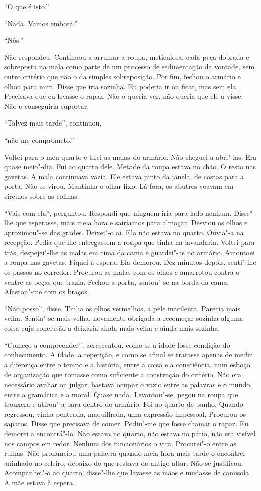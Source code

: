 ``O que é isto.''

``Nada. Vamos embora.''

``Nós.''

Não respondeu. Continuou a arrumar a roupa, meticulosa, cada peça
dobrada e sobreposta na mala como parte de um processo de sedimentação
da vontade, sem outro critério que não o da simples sobreposição. Por
fim, fechou o armário e olhou para mim. Disse que iria sozinha. Eu
poderia ir ou ficar, mas sem ela. Precisava que eu levasse o rapaz. Não
o queria ver, não queria que ele a visse. Não o conseguiria suportar.

``Talvez mais tarde'',
continuou,

``não me comprometo.''

Voltei para o meu quarto e tirei as malas do armário. Não cheguei a
abri"-las. Era quase meio"-dia. Fui ao quarto dele. Metade da roupa
estava no chão. O resto nas gavetas. A mala continuava vazia. Ele estava
junto da janela, de costas para a porta. Não se virou. Mantinha o olhar
fixo. Lá fora, os abutres voavam em círculos sobre as colinas.

``Vais com ela'',
perguntou. Respondi que ninguém iria para lado nenhum. Disse"-lhe que
esperasse, mais meia hora e sairíamos para almoçar. Desviou os olhos e
aproximou"-se das grades. Deixei"-o aí. Ela não estava no quarto.
Ouvia"-a na recepção. Pedia que lhe entregassem a roupa que tinha na
lavandaria. Voltei para trás, despejei"-lhe as malas em cima da cama e
guardei"-as no armário. Amontoei a roupa nas gavetas. Fiquei à espera.
Ela demorou. Dez minutos depois, senti"-lhe os passos no corredor.
Procurou as malas com os olhos e amarrotou contra o ventre as peças que
trazia. Fechou a porta, sentou"-se na borda da cama. Afastou"-me com os
braços.

``Não posso'',
disse. Tinha os olhos vermelhos, a pele macilenta. Parecia mais velha.
Sentia"-se mais velha, novamente obrigada a recomeçar sozinha alguma
coisa cuja conclusão a deixaria ainda mais velha e ainda mais sozinha.

``Começo a compreender'',
acrescentou, como se a idade fosse condição do conhecimento. A idade, a
repetição, e como se afinal se tratasse apenas de medir a diferença
entre o tempo e a história, entre a coisa e a consciência, num esboço de
organização que tomasse como suficiente a construção do critério. Não
era necessário avaliar ou julgar, bastava ocupar o vazio entre as
palavras e o mundo, entre a gramática e a moral. Quase nada.
Levantou"-se, pegou na roupa que trouxera e atirou"-a para dentro do
armário. Foi ao quarto de banho. Quando regressou, vinha penteada,
maquilhada, uma expressão impessoal. Procurou os sapatos. Disse que
precisava de comer. Pediu"-me que fosse chamar o rapaz. Eu demorei a
encontrá"-lo. Não estava no quarto, não estava no pátio, não era visível
nos campos em redor. Nenhum dos funcionários o vira. Procurei"-o entre
as ruínas. Não pronunciou uma palavra quando meia hora mais tarde o
encontrei aninhado no celeiro, debaixo do que restava do antigo altar.
Não se justificou. Acompanhei"-o ao quarto, disse"-lhe que lavasse as
mãos e mudasse de camisola. A mãe estava à espera.

